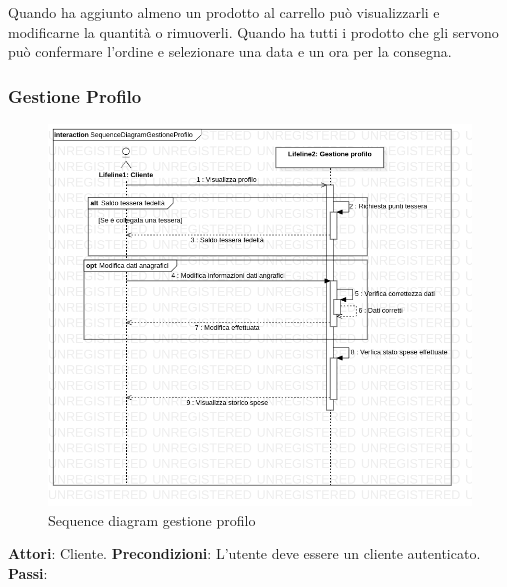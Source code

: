 \documentclass[12pt, a4paper]{report}
\begin{document}
Quando ha aggiunto almeno un prodotto al carrello può visualizzarli e
modificarne la quantità o rimuoverli. Quando ha tutti i prodotto che gli
servono può confermare l'ordine e selezionare una data e un ora per la
consegna.

\newpage

\subsubsection{Gestione Profilo}

\begin{figure}[h]
  \centering
  \includegraphics[width=\textwidth]{Use Case Model!Gestione profilo!InteractionGestioneProfilo!SequenceDiagramGestioneProfilo_5.png}
  \caption{Sequence diagram gestione profilo}
\end{figure}
\break
\textbf{Attori}: Cliente.\newline
\textbf{Precondizioni}: L'utente deve essere un cliente autenticato. \newline
\textbf{Passi}: 
\end{document}
